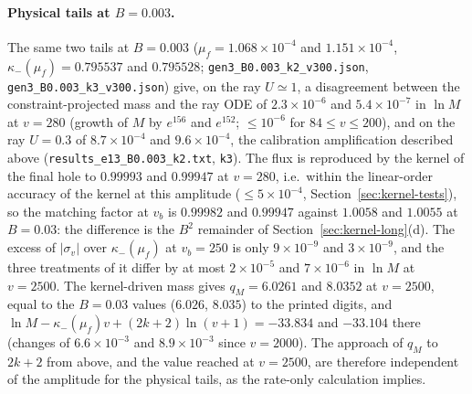 \documentclass[11pt]{article}
\begin{document}
\paragraph{Physical tails at $B=0.003$.} The same two tails at $B=0.003$ ($\mu_f=1.068\times10^{-4}$ and $1.151\times10^{-4}$, $\kappa_-(\mu_f)=0.795537$ and $0.795528$; \texttt{gen3\_B0.003\_k2\_v300.json}, \texttt{gen3\_B0.003\_k3\_v300.json}) give, on the ray $U\simeq1$, a disagreement between the constraint-projected mass and the ray ODE of $2.3\times10^{-6}$ and $5.4\times10^{-7}$ in $\ln M$ at $v=280$ (growth of $M$ by $e^{156}$ and $e^{152}$; $\le10^{-6}$ for $84\le v\le200$), and on the ray $U=0.3$ of $8.7\times10^{-4}$ and $9.6\times10^{-4}$, the calibration amplification described above (\texttt{results\_e13\_B0.003\_k2.txt}, \texttt{k3}). The flux is reproduced by the kernel of the final hole to $0.99993$ and $0.99947$ at $v=280$, i.e.\ within the linear-order accuracy of the kernel at this amplitude ($\le5\times10^{-4}$, Section~\ref{sec:kernel-tests}), so the matching factor at $v_b$ is $0.99982$ and $0.99947$ against $1.0058$ and $1.0055$ at $B=0.03$: the difference is the $B^2$ remainder of Section~\ref{sec:kernel-long}(d). The excess of $|\sigma_v|$ over $\kappa_-(\mu_f)$ at $v_b=250$ is only $9\times10^{-9}$ and $3\times10^{-9}$, and the three treatments of it differ by at most $2\times10^{-5}$ and $7\times10^{-6}$ in $\ln M$ at $v=2500$. The kernel-driven mass gives $q_M=6.0261$ and $8.0352$ at $v=2500$, equal to the $B=0.03$ values ($6.026$, $8.035$) to the printed digits, and $\ln M-\kappa_-(\mu_f)v+(2k+2)\ln(v+1)=-33.834$ and $-33.104$ there (changes of $6.6\times10^{-3}$ and $8.9\times10^{-3}$ since $v=2000$). The approach of $q_M$ to $2k+2$ from above, and the value reached at $v=2500$, are therefore independent of the amplitude for the physical tails, as the rate-only calculation implies.
\end{document}
